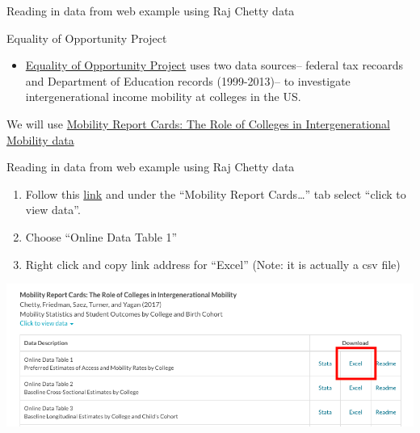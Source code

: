 \documentclass[8pt,ignorenonframetext,dvipsnames]{beamer}
\providecommand{\tightlist}{%
  \setlength{\itemsep}{0pt}\setlength{\parskip}{0pt}}
\let\olditem\item
\renewcommand{\item}{%
  \olditem\vspace{4pt}
}
\begin{document}
\begin{frame}{Reading in data from web example using Raj Chetty data}

Equality of Opportunity Project

\begin{itemize}
\tightlist
\item
  \href{http://www.equality-of-opportunity.org/papers/coll_mrc_paper.pdf}{Equality
  of Opportunity Project} uses two data sources-- federal tax recoards
  and Department of Education records (1999-2013)-- to investigate
  intergenerational income mobility at colleges in the US.
\end{itemize}

We will use
\href{http://www.equality-of-opportunity.org/documents/}{Mobility Report
Cards: The Role of Colleges in Intergenerational Mobility data}

\end{frame}

\begin{frame}{Reading in data from web example using Raj Chetty data}

\begin{enumerate}
\def\labelenumi{\arabic{enumi}.}
\tightlist
\item
  Follow this \href{http://www.equality-of-opportunity.org/data/}{link}
  and under the ``Mobility Report Cards\ldots{}'' tab select ``click to
  view data''.\\
\item
  Choose ``Online Data Table 1''
\item
  Right click and copy link address for ``Excel'' (Note: it is actually
  a csv file)
\end{enumerate}

\includegraphics{mrc_table1.png}~

\end{frame}
\end{document}
